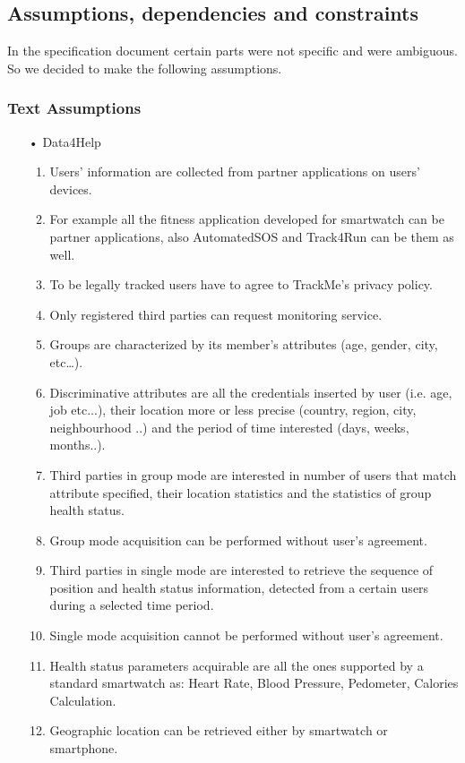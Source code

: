 \subsection{Assumptions, dependencies and constraints}
In the specification document certain parts were not specific and were ambiguous. So we decided to make the following assumptions.

\subsubsection{Text Assumptions}
\begin{enumerate}

\item[•] {\Large Data4Help}
	\begin{enumerate}
	\item Users' information are collected from partner applications on users' devices.
	\item For example all the fitness application developed for smartwatch can be partner applications, also AutomatedSOS and Track4Run can be them as well.
	\item To be legally tracked users have to agree to TrackMe's privacy policy.
	\item Only registered third parties can request monitoring service.
	\item Groups are characterized by its member’s attributes (age, gender, city, etc…).
	\item Discriminative attributes are all the credentials inserted by user (i.e. age, job etc...), their location more or less precise (country, region, city, neighbourhood ..) and the period of time interested (days, weeks, months..).
	\item Third parties in group mode are interested in number of users that match attribute specified, their location statistics and the statistics of group health status.
	\item Group mode acquisition can be performed without user's agreement.
	\item Third parties in single mode are interested to retrieve the sequence of position and health status information, detected from a certain users during a selected time period.	
	\item Single mode acquisition cannot be performed without user's agreement.
	\item Health status parameters acquirable are all the ones supported by a standard smartwatch as: Heart Rate, Blood Pressure, Pedometer, Calories Calculation.
	\item Geographic location can be retrieved either by smartwatch or smartphone.
	\end{enumerate}
	

\end{enumerate}
